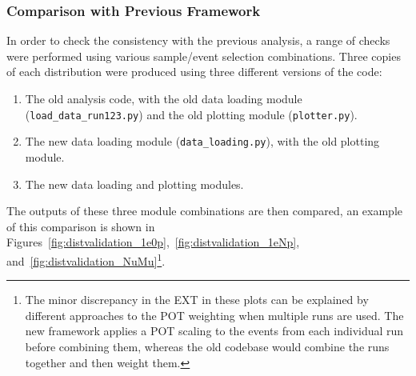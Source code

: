\subsubsection{Comparison with Previous Framework}
\label{sec:compprevframework}

In order to check the consistency with the previous analysis, a range of checks were performed using various sample/event selection combinations. Three copies of each distribution were produced using three different versions of the code:
%
\begin{enumerate}
    \item The old analysis code, with the old data loading module (\verb|load_data_run123.py|) and the old plotting module (\verb|plotter.py|).
    \item The new data loading module (\verb|data_loading.py|), with the old plotting module.
    \item The new data loading and plotting modules.
\end{enumerate}
%
The outputs of these three module combinations are then compared, an example of this comparison is shown in Figures~\ref{fig:distvalidation_1e0p},~\ref{fig:distvalidation_1eNp}, and~\ref{fig:distvalidation_NuMu}\footnote{The minor discrepancy in the EXT in these plots can be explained by different approaches to the POT weighting when multiple runs are used. The new framework applies a POT scaling to the events from each individual run before combining them, whereas the old codebase would combine the runs together and then weight them.}.
%
